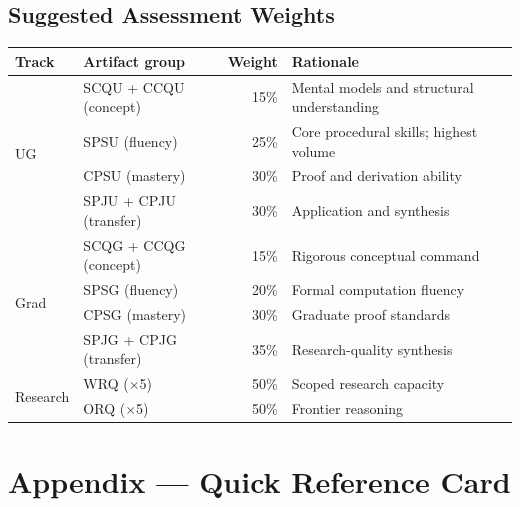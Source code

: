 \documentclass[11pt,a4paper]{article}
\begin{document}
\subsection{Suggested Assessment Weights}

\begin{center}
\begin{tabular}{llrp{5.5cm}}
\toprule
\textbf{Track} & \textbf{Artifact group} & \textbf{Weight} & \textbf{Rationale}\\
\midrule
\multirow{4}{*}{\textcolor{ugblue}{UG}}
  & SCQU + CCQU (concept)  & 15\% & Mental models and structural understanding\\
  & SPSU (fluency)         & 25\% & Core procedural skills; highest volume\\
  & CPSU (mastery)         & 30\% & Proof and derivation ability\\
  & SPJU + CPJU (transfer) & 30\% & Application and synthesis\\
\midrule
\multirow{4}{*}{\textcolor{gradred}{Grad}}
  & SCQG + CCQG (concept)  & 15\% & Rigorous conceptual command\\
  & SPSG (fluency)         & 20\% & Formal computation fluency\\
  & CPSG (mastery)         & 30\% & Graduate proof standards\\
  & SPJG + CPJG (transfer) & 35\% & Research-quality synthesis\\
\midrule
\multirow{2}{*}{\textcolor{respath}{Research}}
  & WRQ ($\times$5)        & 50\% & Scoped research capacity\\
  & ORQ ($\times$5)        & 50\% & Frontier reasoning\\
\bottomrule
\end{tabular}
\end{center}

\newpage
\section*{Appendix --- Quick Reference Card}
\end{document}
